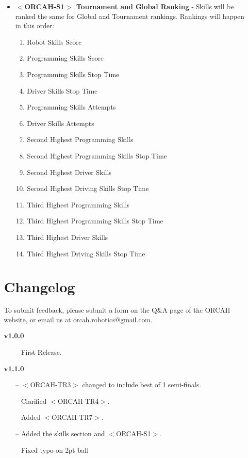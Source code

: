 \documentclass[letterpaper, 12pt]{article}
\begin{document}
\begin{itemize}[label={}]

\item\textbf{$<$ORCAH-S1$>$ Tournament and Global Ranking} - Skills will be ranked the same for Global and Tournament rankings.  Rankings will happen in this order:

\begin{enumerate}
\item Robot Skills Score
\item Programming Skills Score
\item Programming Skills Stop Time
\item Driver Skills Stop Time
\item Programming Skills Attempts
\item Driver Skills Attempts
\item Second Highest Programming Skills
\item Second Highest Programming Skills Stop Time
\item Second Highest Driver Skills
\item Second Highest Driving Skills Stop Time
\item Third Highest Programming Skills
\item Third Highest Programming Skills Stop Time
\item Third Highest Driver Skills
\item Third Highest Driving Skills Stop Time
\end{enumerate}

\end{itemize}

\newpage

\section*{Changelog}
To submit feedback, please submit a form on the Q\&A page of the ORCAH website, or email us at orcah.robotics@gmail.com.

\vspace{0.25in}

\noindent
\textbf{v1.0.0}

\begin{itemize}
\item[--] First Release.
\end{itemize}

\noindent
\textbf{v1.1.0}

\begin{itemize}
\item[--] $<$ORCAH-TR3$>$ changed to include best of 1 semi-finals.
\item[--] Clarified $<$ORCAH-TR4$>$.
\item[--] Added $<$ORCAH-TR7$>$.
\item[--] Added the skills section and $<$ORCAH-S1$>$.
\item[--] Fixed typo on 2pt ball
\end{itemize}
\end{document}
